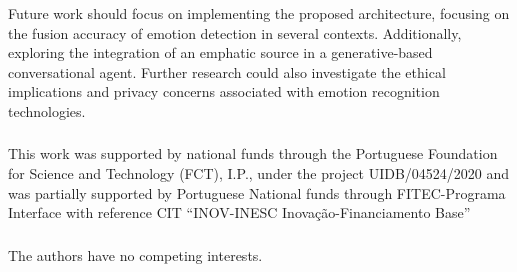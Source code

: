 \documentclass[runningheads]{llncs}
\begin{document}
Future work should focus on implementing the proposed architecture, focusing on the fusion accuracy of emotion detection in several contexts. Additionally, exploring the integration of an emphatic source in a generative-based conversational agent. Further research could also investigate the ethical implications and privacy concerns associated with emotion recognition technologies.

\begin{credits}
\subsubsection{\ackname} This work was supported by national funds through the Portuguese Foundation for Science and Technology (FCT), I.P., under the project UIDB/04524/2020 and was partially supported by Portuguese National funds through FITEC-Programa Interface with reference CIT “INOV-INESC Inovação-Financiamento Base”

\subsubsection{\discintname}
The authors have no competing interests.
\end{credits}
%
%
%


%
\end{document}
